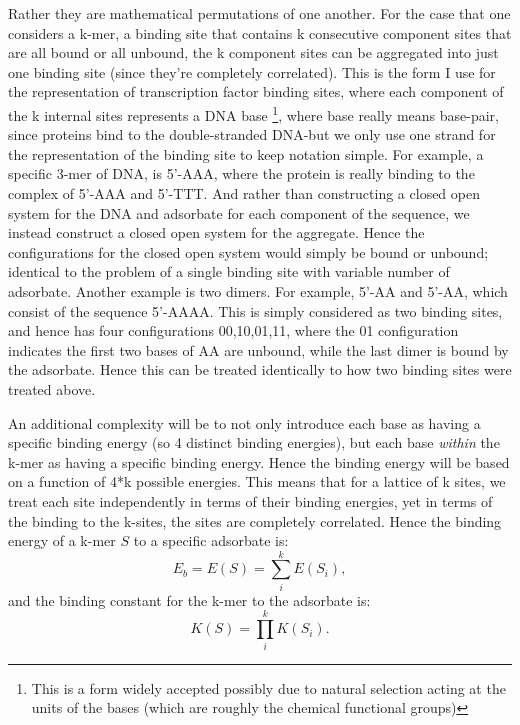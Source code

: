 Rather they are mathematical permutations of one another.  For the case that one considers a k-mer, a binding site that contains k consecutive component sites that are all bound or all unbound, the k component sites can be aggregated into just one binding site (since they're completely correlated).  This is the form I use for the representation of transcription factor binding sites, where each component of the k internal sites represents a DNA base \footnote{This is a form widely accepted possibly due to natural selection acting at the units of the bases (which are roughly the chemical functional groups)}, where base really means base-pair, since proteins bind to the double-stranded DNA-but we only use one strand for the representation of the binding site to keep notation simple.  For example, a specific 3-mer of DNA, is 5'-AAA, where the protein is really binding to the complex of 5'-AAA and 5'-TTT.  And rather than constructing a closed open system for the DNA and adsorbate for each component of the sequence, we instead construct a closed open system for the aggregate.  Hence the configurations for the closed open system would simply be bound or unbound; identical to the problem of a single binding site with variable number of adsorbate.  Another example is two dimers.  For example, 5'-AA and 5'-AA, which consist of the sequence 5'-AAAA.  This is simply considered as two binding sites, and hence has four configurations 00,10,01,11, where the 01 configuration indicates the first two bases of AA are unbound, while the last dimer is bound by the adsorbate.  Hence this can be treated identically to how two binding sites were treated above.

An additional complexity will be to not only introduce each base as having a specific binding energy (so 4 distinct binding energies), but each base \textit{within} the k-mer as having a specific binding energy.  Hence the binding energy will be based on a function of 4*k possible energies.  This means that for a lattice of k sites, we treat each site independently in terms of their binding energies, yet in terms of the binding to the k-sites, the sites are completely correlated.  Hence the binding energy of a k-mer $S$ to a specific adsorbate is:
\begin{equation}
E_b= E(S)=\sum_i^k E(S_i),
\end{equation}\label{energyS}
and the binding constant for the k-mer to the adsorbate is:
\begin{equation}
K(S)=\prod_i^k K(S_i).
\end{equation}

